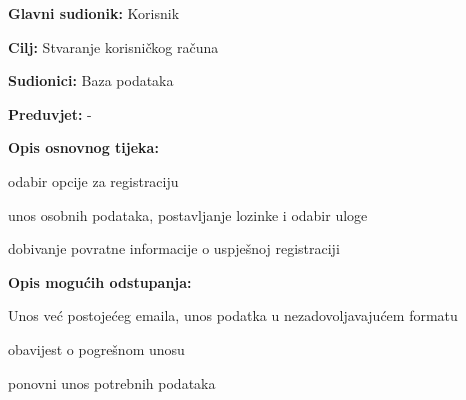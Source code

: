 					\noindent {}
					\begin{packed_item}
	
						\item \textbf{Glavni sudionik: }Korisnik
						\item  \textbf{Cilj:} Stvaranje korisničkog računa
						\item  \textbf{Sudionici:} Baza podataka
						\item  \textbf{Preduvjet:} -
						\item  \textbf{Opis osnovnog tijeka:}
						
						\item[] \begin{packed_enum}
	
							\item odabir opcije za registraciju 
							\item unos osobnih podataka, postavljanje lozinke i odabir uloge
							\item dobivanje povratne informacije o uspješnoj registraciji
							
						\end{packed_enum}
						
						\item  \textbf{Opis mogućih odstupanja:}
						
						\item[] \begin{packed_item}
	
							\item[2.a] Unos već postojećeg emaila, unos podatka u nezadovoljavajućem formatu
							\item[] \begin{packed_enum}
								
								\item obavijest o pogrešnom unosu
								\item ponovni unos potrebnih podataka
								
							\end{packed_enum}
							
							
						\end{packed_item}
					\end{packed_item}
					
